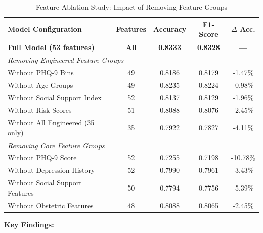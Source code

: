 \begin{table}[htbp]
\centering
\caption{Feature Ablation Study: Impact of Removing Feature Groups}
\label{tab:feature_ablation}
\begin{tabular}{lcccc}
\toprule
\textbf{Model Configuration} & \textbf{Features} & \textbf{Accuracy} & \textbf{F1-Score} & \textbf{$\Delta$ Acc.} \\
\midrule
\textbf{Full Model (53 features)} & \textbf{All} & \textbf{0.8333} & \textbf{0.8328} & \textbf{—} \\
\midrule
\multicolumn{5}{l}{\textit{Removing Engineered Feature Groups}} \\
\midrule
Without PHQ-9 Bins & 49 & 0.8186 & 0.8179 & -1.47\% \\
Without Age Groups & 49 & 0.8235 & 0.8224 & -0.98\% \\
Without Social Support Index & 52 & 0.8137 & 0.8129 & -1.96\% \\
Without Risk Scores & 51 & 0.8088 & 0.8076 & -2.45\% \\
Without All Engineered (35 only) & 35 & 0.7922 & 0.7827 & -4.11\% \\
\midrule
\multicolumn{5}{l}{\textit{Removing Core Feature Groups}} \\
\midrule
Without PHQ-9 Score & 52 & 0.7255 & 0.7198 & -10.78\% \\
Without Depression History & 52 & 0.7990 & 0.7961 & -3.43\% \\
Without Social Support Features & 50 & 0.7794 & 0.7756 & -5.39\% \\
Without Obstetric Features & 48 & 0.8088 & 0.8065 & -2.45\% \\
\bottomrule
\end{tabular}
\end{table}

\textbf{Key Findings:}

